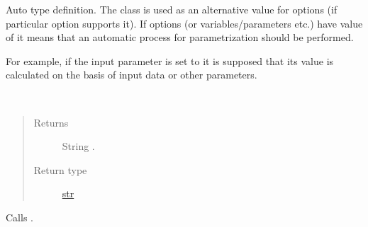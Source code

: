 \documentclass[a4paper,10pt,english]{sphinxmanual}
\begin{document}

\begin{fulllineitems}
\label{aqueduct.utils.helpers:aqueduct.utils.helpers.Auto}
Auto type definition.
The class is used as an alternative value for options (if particular option supports it).
If options (or variables/parameters etc.) have value of {\hyperref[aqueduct.utils.helpers:aqueduct.utils.helpers.Auto]{}} it means that an automatic
process for parametrization should be performed.

For example, if the input parameter is set to {\hyperref[aqueduct.utils.helpers:aqueduct.utils.helpers.Auto]{}} it is supposed that its value is calculated
on the basis of input data or other parameters.

\begin{fulllineitems}
\label{aqueduct.utils.helpers:aqueduct.utils.helpers.Auto.__repr__}~\begin{quote}\begin{description}
\item[{Returns}] \leavevmode
String .

\item[{Return type}] \leavevmode
\href{http://docs.python.org/2/library/functions.html\#str}{str}

\end{description}\end{quote}

\end{fulllineitems}


\begin{fulllineitems}
\label{aqueduct.utils.helpers:aqueduct.utils.helpers.Auto.__str__}
Calls {\hyperref[aqueduct.utils.helpers:aqueduct.utils.helpers.Auto.__repr__]{}}.

\end{fulllineitems}


\end{fulllineitems}

\end{document}

